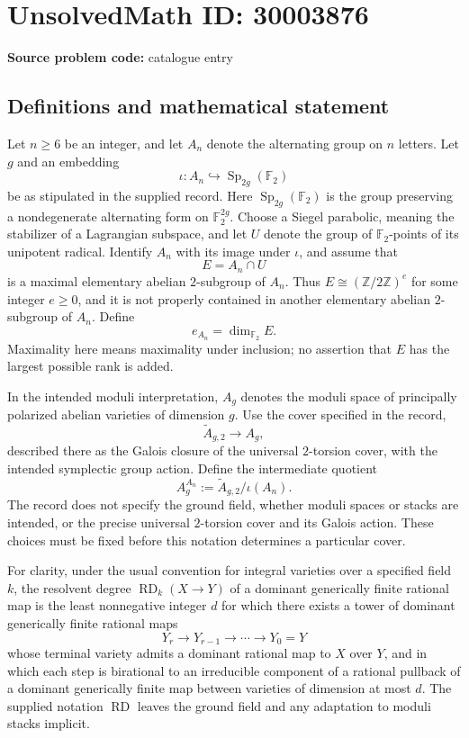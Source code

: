 \documentclass[11pt]{article}
\newcommand{\Z}{\mathbb{Z}}
\newcommand{\F}{\mathbb{F}}
\begin{document}
\section*{UnsolvedMath ID: 30003876}
\textbf{Source problem code:} catalogue entry
\subsection{Definitions and mathematical statement}
Let \(n\geq 6\) be an integer, and let \(A_n\) denote the alternating group on \(n\) letters. Let \(g\) and an embedding
\[
\iota\colon A_n\hookrightarrow \operatorname{Sp}_{2g}(\F_2)
\]
be as stipulated in the supplied record. Here \(\operatorname{Sp}_{2g}(\F_2)\) is the group preserving a nondegenerate alternating form on \(\F_2^{2g}\). Choose a Siegel parabolic, meaning the stabilizer of a Lagrangian subspace, and let \(U\) denote the group of \(\F_2\)-points of its unipotent radical. Identify \(A_n\) with its image under \(\iota\), and assume that
\[
E=A_n\cap U
\]
is a maximal elementary abelian \(2\)-subgroup of \(A_n\). Thus \(E\cong (\Z/2\Z)^e\) for some integer \(e\geq 0\), and it is not properly contained in another elementary abelian \(2\)-subgroup of \(A_n\). Define
\[
e_{A_n}=\dim_{\F_2}E.
\]
Maximality here means maximality under inclusion; no assertion that \(E\) has the largest possible rank is added.

In the intended moduli interpretation, \(A_g\) denotes the moduli space of principally polarized abelian varieties of dimension \(g\). Use the cover specified in the record,
\[
\widetilde A_{g,2}\longrightarrow A_g,
\]
described there as the Galois closure of the universal \(2\)-torsion cover, with the intended symplectic group action. Define the intermediate quotient
\[
A_g^{A_n}:=\widetilde A_{g,2}/\iota(A_n).
\]
The record does not specify the ground field, whether moduli spaces or stacks are intended, or the precise universal \(2\)-torsion cover and its Galois action. These choices must be fixed before this notation determines a particular cover.

For clarity, under the usual convention for integral varieties over a specified field \(k\), the resolvent degree \(\operatorname{RD}_k(X\to Y)\) of a dominant generically finite rational map is the least nonnegative integer \(d\) for which there exists a tower of dominant generically finite rational maps
\[
Y_r\longrightarrow Y_{r-1}\longrightarrow\cdots\longrightarrow Y_0=Y
\]
whose terminal variety admits a dominant rational map to \(X\) over \(Y\), and in which each step is birational to an irreducible component of a rational pullback of a dominant generically finite map between varieties of dimension at most \(d\). The supplied notation \(\operatorname{RD}\) leaves the ground field and any adaptation to moduli stacks implicit.
\end{document}
